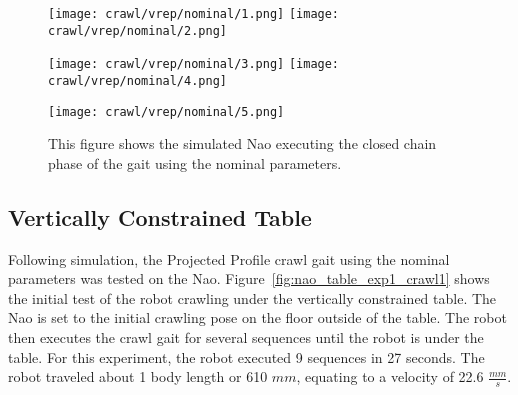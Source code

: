 \begin{figure}
\centering
\texttt{[image: crawl/vrep/nominal/1.png]}
\texttt{[image: crawl/vrep/nominal/2.png]}
  
\centering
\texttt{[image: crawl/vrep/nominal/3.png]}
\texttt{[image: crawl/vrep/nominal/4.png]}
  
\centering
\texttt{[image: crawl/vrep/nominal/5.png]}

\caption{This figure shows the simulated Nao executing the closed chain phase
         of the gait using the nominal parameters.}
\label{fig:vrep_nao_nom_gait1}
\end{figure}

\subsection{Vertically Constrained Table}


Following simulation, the Projected Profile crawl gait using the nominal parameters
was tested on the Nao. Figure~\ref{fig:nao_table_exp1_crawl1} shows the initial test of the
robot crawling under the vertically constrained table. The Nao is set to the initial
crawling pose on the floor outside of the table. The robot then executes the crawl
gait for several sequences until the robot is under the table.
For this experiment, the robot executed 9 sequences in 27 seconds. The robot traveled
about 1 body length or 610 $mm$, equating to a velocity of 22.6 $\frac{mm}{s}$.


